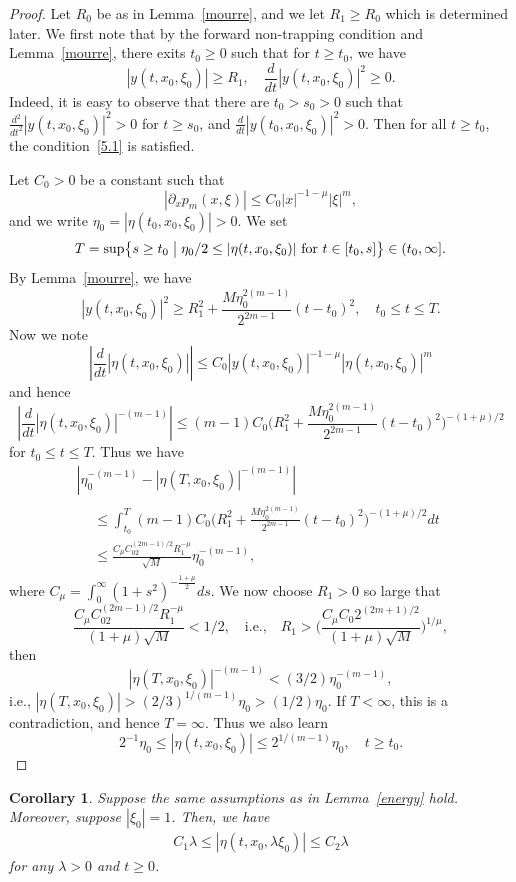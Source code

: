 \documentclass[10pt]{amsart}
\newtheorem{coro}[cdrthm]{Corollary}
\theoremstyle{definition}
\renewcommand*\l{\lambda}
\newcommand*\m{\mu}
\newcommand*\x{\xi}
\newcommand*\y{\eta}
\newcommand*\pa{\partial}
\newcommand{\biggpare}[1]{\biggl(#1\biggr)}
\newcommand{\bigset}[2]{\bigl\{#1\bigm|#2\bigr\}}
\begin{document}
\begin{proof}
Let $R_0$ be as in Lemma~\ref{mourre}, and we let $R_1\geq R_0$ which is determined later. We first note that by the forward non-trapping condition and Lemma~\ref{mourre}, there exits $t_0\geq 0$ such that for $t\geq t_0$, we have
\begin{equation}\label{5.1}
|y(t,x_0,\x_0)|\geq R_1,\quad \frac{d}{dt}|y(t,x_0,\x_0)|^2\geq 0.
\end{equation}
Indeed, it is easy to observe that there are $t_0>s_0>0$ such that $\frac{d^2}{dt^2}|y(t,x_0,\x_0)|^2>0$ for $t\geq s_0$, and $\frac{d}{dt}|y(t_0,x_0,\x_0)|^2> 0$. Then for all $t\geq t_0$, the condition~\eqref{5.1} is satisfied.

Let $C_0>0$ be a constant such that
\[
\left|\pa_{x}p_m(x,\x)\right|\leq C_0 |x|^{-1-\m} |\x|^{m},
\]
and we write $ \y_0=|\y(t_0,x_0,\x_0)|>0$. We set
\[
T=\sup\bigset{s\geq t_0}{\y_0/2\leq |\y(t,x_0,\x_0)|\text{ for }t\in [t_0,s]}\in (t_0,\infty].
\]
By Lemma~\ref{mourre}, we have
\[
|y(t,x_0,\x_0)|^2\geq R_1^2+\frac{M\y_0^{2(m-1)}}{2^{2m-1}}(t-t_0)^2, \quad t_0\leq t\leq T.
\]
Now we note
\[
\left|\frac{d}{dt}|\y(t,x_0,\x_0)|\right|\leq C_0 |y(t,x_0,\x_0)|^{-1-\m}|\y(t,x_0,\x_0)|^m
\]
and hence
\[
\left|\frac{d}{dt}|\y(t,x_0,\x_0)|^{-(m-1)}\right|
\leq (m-1)C_0 \biggpare{R_1^2+\frac{M\y_0^{2(m-1)}}{2^{2m-1}}(t-t_0)^2}^{-(1+\m)/2}
\]
for $t_0\leq t\leq T$. Thus we have
\begin{multline*}
\left| \y_0^{-(m-1)}-\left|\y(T,x_0,\x_0)\right|^{-(m-1)}\right| \\
\begin{aligned}
&\leq \int_{t_0}^T (m-1)C_0 \biggpare{R_1^2+\frac{M\y_0^{2(m-1)}}{2^{2m-1}}(t-t_0)^2}^{-(1+\m)/2}dt \\
&\leq \frac{C_{\m}C_02^{(2m-1)/2}R_1^{-\m}}{\sqrt{M}}\y_0^{-(m-1)},
\end{aligned}
\end{multline*}
where $C_{\m}=\int_0^{\infty}(1+s^2)^{-\frac{1+\m}{2}}ds$. We now choose $R_1>0$ so large that
\[
\frac{C_{\m}C_02^{(2m-1)/2}R_1^{-\m}}{(1+\m)\sqrt{M}}<1/2,
\quad\text{i.e.,}\quad R_1> \biggpare{\frac{C_{\m}C_0 2^{(2m+1)/2}}{(1+\m)\sqrt{M}}}^{1/\m},
\]
then
\[
\left|\y(T,x_0,\x_0)\right|^{-(m-1)}<(3/2)\y_0^{-(m-1)},
\]
i.e., $|\y(T,x_0,\x_0)|>(2/3)^{1/(m-1)}\y_0>(1/2)\y_0$. If $T<\infty$, this is a contradiction, and hence $T=\infty$. Thus we also learn
\[
2^{-1}\y_0\leq |\y(t,x_0,\x_0)|\leq 2^{1/(m-1)}\y_0, \quad t\geq t_0.
\]
\end{proof}

\begin{coro}
Suppose the same assumptions as in Lemma~\ref{energy} hold. Moreover, suppose $|\x_0|=1$. Then, we have
\begin{align*}
C_1\l\leq |\y(t,x_0,\l\x_0)|\leq C_2\l
\end{align*}
for any $\l>0$ and $t\geq 0$.
\end{coro}
\end{document}
